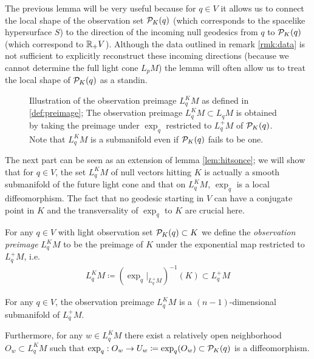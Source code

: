 The previous lemma will be very useful because for $q\in V$ it allows us to connect the local shape of the observation set ${{\mathcal{P}}_K(q)}$ (which corresponds to the spacelike hypersurface $S$) to the direction of the incoming null geodesics from $q$ to ${{\mathcal{P}}_K(q)}$ (which correspond to $\mathbb{R}_+V$). Although the data outlined in remark \ref{rmk:data} is not sufficient to explicitly reconstruct these incoming directions (because we cannot determine the full light cone $L_pM$) the lemma will often allow us to treat the local shape of ${{\mathcal{P}}_K(q)}$ as a standin.

\begin{figure}[h]\label{fig:LKDef}
    \centering
    
    \caption{
        Illustration of the observation preimage $L^K_qM$ as defined in \ref{def:preimage}; The observation preimage $L^K_qM\subset L_qM$ is obtained by taking the preimage under $\exp_q$ restricted to $L_q^+M$ of ${{\mathcal{P}}_K(q)}$. Note that $L^K_qM$ is a submanifold even if ${{\mathcal{P}}_K(q)}$ fails to be one.
    }
\end{figure}
The next part can be seen as an extension of lemma \ref{lem:hitsonce}; we will show that for $q\in V$, the set $L^K_qM$ of null vectors hitting $K$ is actually a smooth submanifold of the future light cone and that on $L^K_qM$, $\exp_q$ is a local diffeomorphism. The fact that no geodesic starting in $V$ can have a conjugate point in $K$ and the transversality of $\exp_q$ to $K$ are crucial here. 
\begin{definition}\label{def:preimage}
For any $q\in V$ with light observation set ${\mathcal{P}}_K(q)\subset K$ we define the \emph{observation preimage} $L^K_qM$ to be the preimage of $K$ under the exponential map restricted to $L^+_qM$, i.e. 
\begin{align*}
    L^K_qM \coloneqq  (\exp_q\rvert_{L^+_qM})^{-1}(K) \subset L^+_qM
\end{align*}
\end{definition}
\begin{lemma}\label{lem:preimage}
For any $q\in V$, the observation preimage $L^K_qM$ is a $(n-1)$-dimensional submanifold of $L^+_qM$. 

Furthermore, for any $w\in L^K_qM$ there exist a relatively open neighborhood $O_w\subset L^K_qM$ such that $\exp_q:O_w\to U_w\coloneqq \exp_q(O_w)\subset {\mathcal{P}}_K(q)$ is a diffeomorphism.
\end{lemma}
